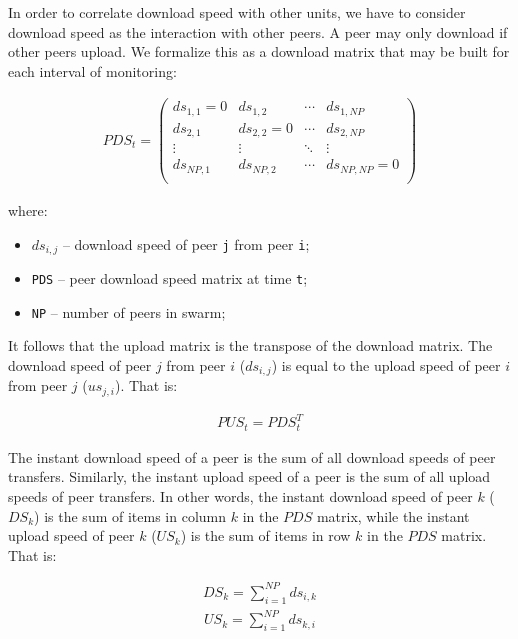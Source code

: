 In order to correlate download speed with other units, we have to consider
download speed as the interaction with other peers. A peer may only download
if other peers upload. We formalize this as a download matrix that may
be built for each interval of monitoring:

\begin{align}
  PDS_{t} =
  \begin{pmatrix}
    ds_{1,1} = 0 & ds_{1,2} & \cdots & ds_{1,NP} \\
    ds_{2,1} & ds_{2,2} = 0 & \cdots & ds_{2,NP} \\
    \vdots & \vdots & \ddots & \vdots \\
    ds_{NP,1} & ds_{NP,2} & \cdots & ds_{NP,NP} = 0 \\
  \end{pmatrix}
\end{align}

where:

\begin{itemize}
  \item $ds_{i,j}$ -- download speed of peer \texttt{j} from peer \texttt{i};
  \item \texttt{PDS} -- peer download speed matrix at time \texttt{t};
  \item \texttt{NP} -- number of peers in swarm;
\end{itemize}

It follows that the upload matrix is the transpose of the download matrix. The
download speed of peer $j$ from peer $i$ ($ds_{i,j}$) is equal to the upload
speed of peer $i$ from peer $j$ ($us_{j,i}$). That is:

\begin{align}
  PUS_{t} = PDS_{t}^{T}
\end{align}

The instant download speed of a peer is the sum of all download speeds of peer
transfers. Similarly, the instant upload speed of a peer is the sum of all
upload speeds of peer transfers. In other words, the instant download speed of
peer $k$ ($DS_{k}$) is the sum of items in column $k$ in the $PDS$ matrix,
while the instant upload speed of peer $k$ ($US_{k}$) is the sum of items in
row $k$ in the $PDS$ matrix. That is:

\begin{align}
  DS_{k} = \sum_{i=1}^{NP} ds_{i,k}
\end{align}
\begin{align}
  US_{k} = \sum_{i=1}^{NP} ds_{k,i}
\end{align}

